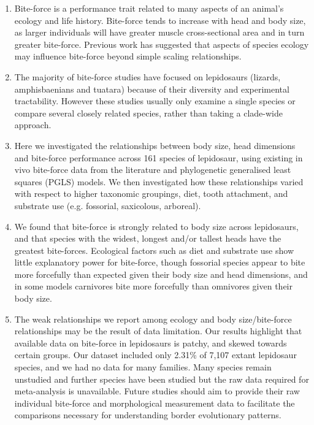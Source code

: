 \documentclass[a4paper, 12pt]{article}
\begin{document}
\begin{enumerate}

\item Bite-force is a performance trait related to many aspects of an animal’s ecology and life history. Bite-force tends to increase with head and body size, as larger individuals will have greater muscle cross-sectional area and in turn greater bite-force. Previous work has suggested that aspects of species ecology may influence bite-force beyond simple scaling relationships.

\item The majority of bite-force studies have focused on lepidosaurs (lizards, amphisbaenians and tuatara) because of their diversity and experimental tractability. However these studies usually only examine a single species or compare several closely related species, rather than taking a clade-wide approach.

\item Here we investigated the relationships between body size, head dimensions and bite-force performance across 161 species of lepidosaur, using existing in vivo bite-force data from the literature and phylogenetic generalised least squares (PGLS) models. We then investigated how these relationships varied with respect to higher taxonomic groupings, diet, tooth attachment, and substrate use (e.g. fossorial, saxicolous, arboreal). 

\item We found that bite-force is strongly related to body size across lepidosaurs, and that species with the widest, longest and/or tallest heads have the greatest bite-forces. Ecological factors such as diet and substrate use show little explanatory power for bite-force, though fossorial species appear to bite more forcefully than expected given their body size and head dimensions, and in some models carnivores bite more forcefully than omnivores given their body size.

\item The weak relationships we report among ecology and body size/bite-force relationships may be the result of data limitation. Our results highlight that available data on bite-force in lepidosaurs is patchy, and skewed towards certain groups. Our dataset included only 2.31\% of 7,107 extant lepidosaur species, and we had no data for many families. Many species remain unstudied and further species have been studied but the raw data required for meta-analysis is unavailable. Future studies should aim to provide their raw individual bite-force and morphological measurement data to facilitate the comparisons necessary for understanding border evolutionary patterns. 

\end{enumerate}
\end{document}
